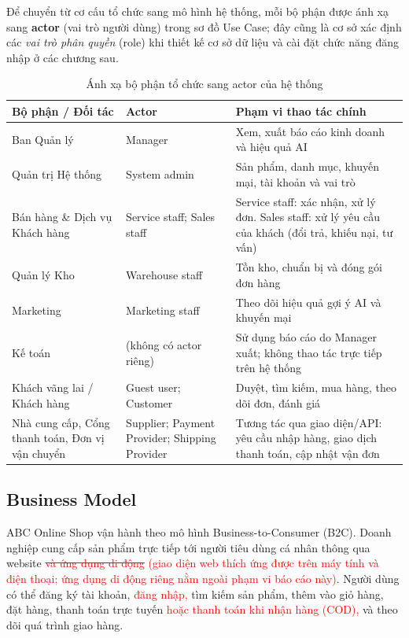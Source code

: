 \documentclass[12pt,a4paper,oneside]{report}
\newif\ifmark \marktrue
\newcommand{\chg}[1]{\ifmark\textcolor{red}{#1}\else #1\fi}
\newcommand{\del}[1]{\ifmark\textcolor{red}{\sout{#1}}\fi}
\newenvironment{chgblock}{\ifmark\color{red}\fi}{}
\begin{document}
\begin{chgblock}
Để chuyển từ cơ cấu tổ chức sang mô hình hệ thống, mỗi bộ phận được ánh xạ sang \textbf{actor} (vai trò người dùng) trong sơ đồ Use Case; đây cũng là cơ sở xác định các \emph{vai trò phân quyền} (role) khi thiết kế cơ sở dữ liệu và cài đặt chức năng đăng nhập ở các chương sau.

\begin{longtable}{p{5.2cm}p{4.2cm}p{6.4cm}}
\caption{Ánh xạ bộ phận tổ chức sang actor của hệ thống}\\
\toprule
\textbf{Bộ phận / Đối tác} & \textbf{Actor} & \textbf{Phạm vi thao tác chính} \\
\midrule
\endhead
\bottomrule
\endlastfoot
Ban Quản lý & Manager & Xem, xuất báo cáo kinh doanh và hiệu quả AI \\
Quản trị Hệ thống & System admin & Sản phẩm, danh mục, khuyến mại, tài khoản và vai trò \\
Bán hàng \& Dịch vụ Khách hàng & Service staff; Sales staff & Service staff: xác nhận, xử lý đơn. Sales staff: xử lý yêu cầu của khách (đổi trả, khiếu nại, tư vấn) \\
Quản lý Kho & Warehouse staff & Tồn kho, chuẩn bị và đóng gói đơn hàng \\
Marketing & Marketing staff & Theo dõi hiệu quả gợi ý AI và khuyến mại \\
Kế toán & (không có actor riêng) & Sử dụng báo cáo do Manager xuất; không thao tác trực tiếp trên hệ thống \\
Khách vãng lai / Khách hàng & Guest user; Customer & Duyệt, tìm kiếm, mua hàng, theo dõi đơn, đánh giá \\
Nhà cung cấp, Cổng thanh toán, Đơn vị vận chuyển & Supplier; Payment Provider; Shipping Provider & Tương tác qua giao diện/API: yêu cầu nhập hàng, giao dịch thanh toán, cập nhật vận đơn \\
\end{longtable}
\end{chgblock}

\subsection{Business Model}

ABC Online Shop vận hành theo mô hình Business-to-Consumer (B2C). Doanh nghiệp cung cấp sản phẩm trực tiếp tới người tiêu dùng cá nhân thông qua website \del{và ứng dụng di động}\chg{ (giao diện web thích ứng được trên máy tính và điện thoại; ứng dụng di động riêng nằm ngoài phạm vi báo cáo này)}. Người dùng có thể đăng ký tài khoản, \chg{đăng nhập, }tìm kiếm sản phẩm, thêm vào giỏ hàng, đặt hàng, thanh toán trực tuyến \chg{hoặc thanh toán khi nhận hàng (COD), }và theo dõi quá trình giao hàng.
\end{document}
